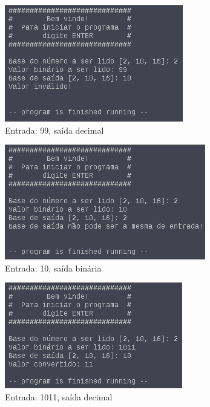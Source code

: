 \documentclass{article}
\begin{document}
\begin{figure}[H]
  \includegraphics[width=\linewidth]{./CasoBin6}
  \caption{Entrada: 99, saída decimal}
  \label{fig:bin6}
\end{figure}

\begin{figure}[H]
  \includegraphics[width=\linewidth]{./CasoBin7}
  \caption{Entrada: 10, saída binária}
  \label{fig:bin7}
\end{figure}

\begin{figure}[H]
  \includegraphics[width=\linewidth]{./CasoBin8}
  \caption{Entrada: 1011, saída decimal}
  \label{fig:bin8}
\end{figure}
\end{document}
